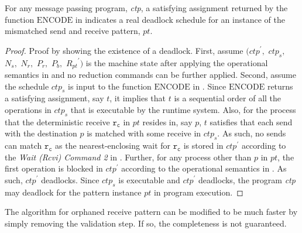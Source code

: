 

\begin{lemma}
For any message passing program, \textit{ctp}, a satisfying assignment returned by the function $\mathrm{ENCODE}$ in  indicates a real deadlock schedule for an instance of the mismatched send and receive pattern, $\mathit{pt}$. 
\label{lemma:mismatch}
\end{lemma}
\begin{proof}
Proof by showing the existence of a deadlock. First, assume $(\mathit{ctp}^\prime,$ $\mathit{ctp}_s,$ $\mathit{N_s},$ $\mathit{N_r},$ $\mathit{P_r},$ $\mathit{P_b},$ $\mathit{R_{pt}}^\prime)$ is the machine state after applying the operational semantics in  and no reduction commands can be further applied. Second, assume the schedule $\mathit{ctp}_s$ is input to the function $\mathrm{ENCODE}$ in . Since $\mathrm{ENCODE}$ returns a satisfying assignment, say $\mathit{t}$, it implies that $\mathit{t}$ is a sequential order of all the operations in $\mathit{ctp}_s$ that is executable by the runtime system. Also, for the process that the deterministic receive $\mathtt{r_c}$ in $\mathit{pt}$ resides in, say $\mathit{p}$, $\mathit{t}$ satisfies that each send with the destination $\mathit{p}$ is matched with some receive in $\mathit{ctp}_s$. As such, no sends can match $\mathtt{r_c}$ as the nearest-enclosing wait for $\mathtt{r_c}$ is stored in $\mathit{ctp}^\prime$ according to the \emph{Wait (Rcvi) Command 2} in . Further, for any process other than $\mathit{p}$ in $\mathit{pt}$, the first operation is blocked in $\mathit{ctp}^\prime$ according to the operational semantics in . As such, $\mathit{ctp}^\prime$ deadlocks. Since $\mathit{ctp}_s$ is executable and $\mathit{ctp}^\prime$ deadlocks, the program \textit{ctp} may deadlock for the pattern instance $\mathit{pt}$ in program execution. 
\end{proof}

The algorithm for orphaned receive pattern can be modified to be much faster by simply removing the validation step. If so, the completeness is not guaranteed. 


